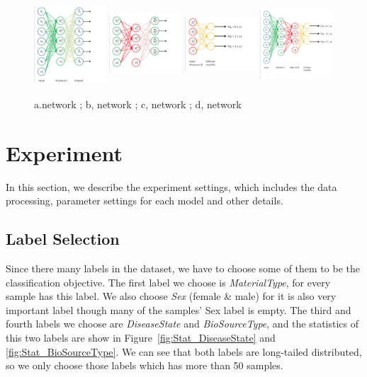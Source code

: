 \documentclass[sigconf]{acmart}
\begin{document}
\begin{figure}[]
	\centering
	\includegraphics[width=0.24\textwidth,height=3cm]{../figs/pretrain1.png}
	\includegraphics[width=0.24\textwidth,height=3cm]{../figs/pretrain2.png}
	\includegraphics[width=0.24\textwidth,height=3cm]{../figs/pretrain3.png}
	\includegraphics[width=0.24\textwidth,height=3cm]{../figs/pretrain4.png}
	\caption{a.network ;  b, network ; c, network ; d, network }
	\label{pretrain_1}
	\centering
\end{figure}

	
	\section{Experiment}
	In this section, we describe the experiment settings, which includes the data processing, parameter settings for each model and other details.
	
	\subsection{Label Selection}
	Since there many labels in the dataset, we have to choose some of them to be the classification objective. The first label we choose is \textit{MaterialType}, for every sample has this label. We also choose \textit{Sex} (female \& male) for it is also very important label though many of the samples' Sex label is empty. The third and fourth labels we choose are \textit{DiseaseState} and \textit{BioSourceType}, and the statistics of this two labels are show in Figure~\ref{fig:Stat_DiseaseState} and \ref{fig:Stat_BioSourceType}. We can see that both labels are long-tailed distributed, so we only choose those labels which has more than 50 samples. 
	
\end{document}
